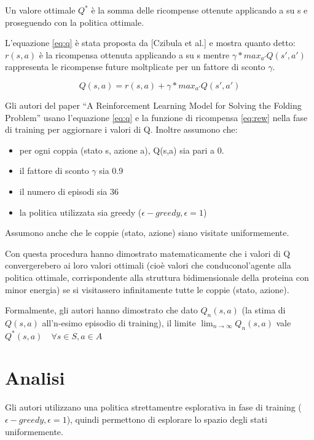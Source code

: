 \documentclass[conference]{IEEEtran}
\begin{document}
Un valore ottimale $Q^*$ è la somma delle ricompense ottenute applicando a su s e proseguendo con la politica ottimale.

L'equazione \ref{eq:q} è stata proposta da [Czibula et al.] e mostra quanto detto: $r(s,a)$ è la ricompensa ottenuta applicando a su s mentre $\gamma * max_{a'} Q(s', a')$ rappresenta le ricompense future moltplicate per un fattore di sconto $\gamma$.

\begin{equation}
\label{eq:q}
Q(s,a) = r(s,a) + \gamma * max_{a'} Q(s', a')
\end{equation}

Gli autori del paper ``A Reinforcement Learning Model for Solving the Folding Problem'' usano l'equazione \ref{eq:q} e la funzione di ricompensa \ref{eq:rew} nella fase di training per aggiornare i valori di Q. Inoltre assumono che:

\begin{itemize}
 \item per ogni coppia (stato s, azione a), Q(s,a) sia pari a 0.
 \item il fattore di sconto $\gamma$ sia 0.9
 \item il numero di episodi sia 36
 \item la politica utilizzata sia greedy ($\epsilon-greedy, \epsilon = 1$)
\end{itemize}

Assumono anche che le coppie (stato, azione) siano visitate uniformemente.

Con questa procedura hanno dimostrato matematicamente che i valori di Q convergerebero ai loro valori ottimali (cioè valori che conduconol'agente alla politica ottimale, corrispondente alla struttura bidimensionale della proteina con minor energia) se si visitassero infinitamente tutte le coppie (stato, azione).

Formalmente, gli autori hanno dimostrato che dato $Q_n(s, a)$ (la stima di $Q(s,a)$ all'n-esimo episodio di training), il limite $\lim_{n \to \infty} Q_n (s,a)$ vale $Q^*(s,a) \quad \forall s \in S, a \in A$

\section{Analisi}

Gli autori utilizzano una politica strettamentre esplorativa in fase di training ($\epsilon-greedy, \epsilon = 1$), quindi permettono di esplorare lo spazio degli stati uniformemente.
\end{document}
